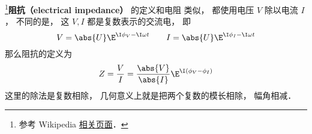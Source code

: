 
\begin{issues}
\issueDraft
\end{issues}


\footnote{参考 Wikipedia \href{https://en.wikipedia.org/wiki/Electrical_impedance}{相关页面}．}\textbf{阻抗（electrical impedance）} 的定义和电阻 类似， 都使用电压 $V$ 除以电流 $I$， 不同的是， 这 $V, I$ 都是复数表示的交流电， 即
\begin{equation}
V = \abs{U} \E^{\I \phi_V - \I \omega t}
\qquad
I = \abs{U} \E^{\I \phi_I - \I \omega t}
\end{equation}
那么阻抗的定义为
\begin{equation}
Z = \frac{V}{I} = \frac{\abs{V}}{\abs{I}} \E^{\I (\phi_V - \phi_I)}
\end{equation}
这里的除法是复数相除， 几何意义上就是把两个复数的模长相除， 幅角相减．

